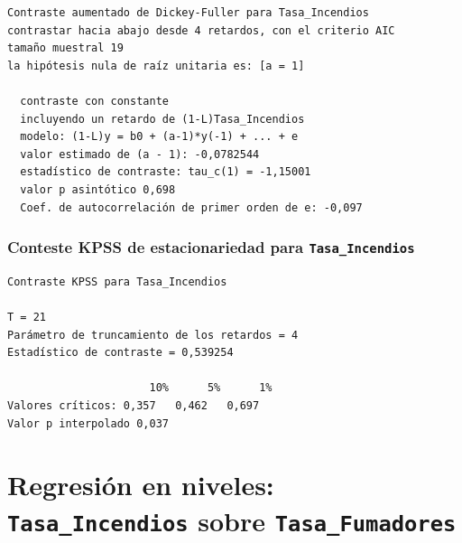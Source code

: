 \documentclass[10pt]{article}
\begin{document}
{\footnotesize
\begin{verbatim}
Contraste aumentado de Dickey-Fuller para Tasa_Incendios
contrastar hacia abajo desde 4 retardos, con el criterio AIC
tamaño muestral 19
la hipótesis nula de raíz unitaria es: [a = 1]

  contraste con constante 
  incluyendo un retardo de (1-L)Tasa_Incendios
  modelo: (1-L)y = b0 + (a-1)*y(-1) + ... + e
  valor estimado de (a - 1): -0,0782544
  estadístico de contraste: tau_c(1) = -1,15001
  valor p asintótico 0,698
  Coef. de autocorrelación de primer orden de e: -0,097
\end{verbatim}
}
\subsubsection*{Conteste KPSS de estacionariedad para \texttt{Tasa\_Incendios}}
\label{sec:org38562b5}

{\footnotesize
\begin{verbatim}
Contraste KPSS para Tasa_Incendios

T = 21
Parámetro de truncamiento de los retardos = 4
Estadístico de contraste = 0,539254

                      10%      5%      1%
Valores críticos: 0,357   0,462   0,697
Valor p interpolado 0,037
\end{verbatim}
}
\section*{Regresión en niveles: \texttt{Tasa\_Incendios} sobre \texttt{Tasa\_Fumadores}}
\label{sec:org1a45e1f}
\end{document}
